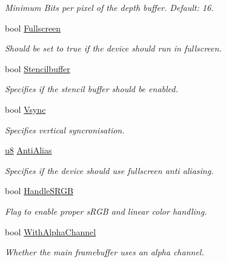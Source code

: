 \begin{DoxyCompactItemize}
\begin{DoxyCompactList}\small\item\em Minimum Bits per pixel of the depth buffer. Default\+: 16. \end{DoxyCompactList}\item 
bool \hyperlink{structirr_1_1SIrrlichtCreationParameters_a40c03ef099d60cec514697baf0b64214}{Fullscreen}
\begin{DoxyCompactList}\small\item\em Should be set to true if the device should run in fullscreen. \end{DoxyCompactList}\item 
bool \hyperlink{structirr_1_1SIrrlichtCreationParameters_a8120cfeac3fbf8b12b1e5f6bd6a8ec2f}{Stencilbuffer}
\begin{DoxyCompactList}\small\item\em Specifies if the stencil buffer should be enabled. \end{DoxyCompactList}\item 
bool \hyperlink{structirr_1_1SIrrlichtCreationParameters_a33b07682f12db0d2c2c3a7bf74f64387}{Vsync}
\begin{DoxyCompactList}\small\item\em Specifies vertical syncronisation. \end{DoxyCompactList}\item 
\hyperlink{namespaceirr_a646874f69af8ff87fc10201b0254a761}{u8} \hyperlink{structirr_1_1SIrrlichtCreationParameters_a50602e6ae0cc3d79ca7df0aa8114e75a}{Anti\+Alias}
\begin{DoxyCompactList}\small\item\em Specifies if the device should use fullscreen anti aliasing. \end{DoxyCompactList}\item 
bool \hyperlink{structirr_1_1SIrrlichtCreationParameters_a4808090b31a2a0e004066bded7bfefc6}{Handle\+S\+R\+GB}
\begin{DoxyCompactList}\small\item\em Flag to enable proper s\+R\+GB and linear color handling. \end{DoxyCompactList}\item 
bool \hyperlink{structirr_1_1SIrrlichtCreationParameters_acae5b5e41cec776aa4d05a03f16c57f2}{With\+Alpha\+Channel}
\begin{DoxyCompactList}\small\item\em Whether the main framebuffer uses an alpha channel. \end{DoxyCompactList}\item 

\end{DoxyCompactItemize}
